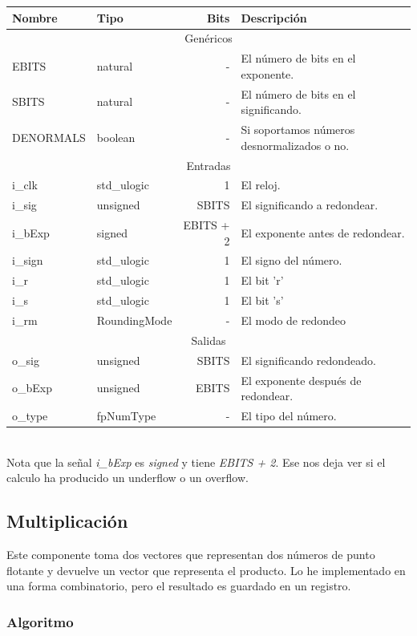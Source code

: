 \documentclass[a4paper]{article}
\begin{document}
\begin{tabular}{| l | l | r | l |}
\hline
\textbf{Nombre} & \textbf{Tipo} & \textbf{Bits} & \textbf{Descripción} \\ \hline
\multicolumn{4}{|c|}{Genéricos} \\ \hline
EBITS & natural & - & El número de bits en el exponente. \\
SBITS & natural & - & El número de bits en el significando. \\
DENORMALS & boolean & - & Si soportamos números desnormalizados o no. \\ \hline
\multicolumn{4}{|c|}{Entradas} \\ \hline
i\_clk & std\_ulogic & 1 & El reloj. \\
i\_sig & unsigned & SBITS & El significando a redondear. \\
i\_bExp & signed & EBITS + 2 & El exponente antes de redondear. \\
i\_sign & std\_ulogic & 1 & El signo del número. \\
i\_r & std\_ulogic & 1 & El bit 'r' \\
i\_s & std\_ulogic & 1 & El bit 's' \\
i\_rm & RoundingMode & - & El modo de redondeo \\ \hline
\multicolumn{4}{|c|}{Salidas} \\ \hline
o\_sig & unsigned & SBITS & El significando redondeado. \\
o\_bExp & unsigned & EBITS & El exponente después de redondear. \\
o\_type & fpNumType & - & El tipo del número. \\ \hline
\end{tabular} \\

Nota que la señal \textit{i\_bExp} es \textit{signed} y tiene \textit{EBITS + 2}. Ese nos deja ver si el calculo ha producido un underflow o un overflow.

\subsection{Multiplicación}

Este componente toma dos vectores que representan dos números de punto flotante y devuelve un vector que representa el producto. Lo he implementado en una forma combinatorio, pero el resultado es guardado en un registro.

\subsubsection{Algoritmo}
\end{document}
